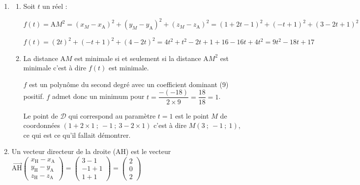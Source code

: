 \documentclass[10pt]{article}
\providecommand{\vect}[1]{\overrightarrow{#1}}
\begin{document}
\begin{enumerate}
\begin{enumerate}
$\left\{\begin{array}{@{}l} x_{\mathrm{A}}=1+2t\\y_{\mathrm{A}}=-t\\z_{\mathrm{A}}=3-2t\end{array}\right. 	
\iff \left\{\begin{array}{@{}l} 1=1+2t\\-1=-t\\-1=3-2t\end{array}\right. 	  
\iff \left\{\begin{array}{@{}l} 0=2t\\1=t\\2t=4\end{array}\right. 	  
\iff \left\{\begin{array}{@{}l} t=0\\t=1\\t=2\end{array}\right. $

Ce système n'admet pas de solution donc le point A n'appartient donc pas à la droite $\mathcal{D}$.
\end{enumerate}

\item
	\begin{enumerate}
		\item  Soit $t$ un réel :

$f(t)=\mathrm{A}M^2= {(x_M - x_\mathrm{A})^2+(y_M - y_\mathrm{A})^2+(z_M - z_\mathrm{A})^2} ={ (1+2t-1)^2+ (-t+1)^2+(3-2t+1)^2    }$

$f(t) ={ (2t)^2+ (-t+1)^2+(4-2t)^2  } 
={ 4t^2+ t^2-2t+1+16-16t+4t^2    }= 9t^2-18t+17$ 

	\item La distance A$M$ est minimale si et seulement si la distance A$M^2$ est minimale c'est à dire $f(t)$ est minimale.

	$f$ est un polynôme du second degré avec un coefficient dominant (9)  positif.  $f$ admet donc un minimum pour $t=\dfrac{-(-18)}{2\times 9} = \dfrac{18}{18}=1$.
	
	Le point de $\mathcal{D}$ qui correspond au paramètre $t=1$ est le point $M$ de coordonnées $(1+2\times 1~;~-1~;~3-2\times 1)$ c'est à dire $M(3~;~-1~;~1)$, ce qui est ce qu'il fallait démontrer.

	\end{enumerate}

\item Un vecteur directeur de la droite (AH) est le vecteur $\vect{\mathrm{AH}} \begin{pmatrix} x_\mathrm{H}-x_\mathrm{A}\\y_\mathrm{H}-y_\mathrm{A}\\z_\mathrm{H}-z_\mathrm{A} \end{pmatrix} = \begin{pmatrix} 3-1\\-1+1\\1+1\end{pmatrix}= \begin{pmatrix} 2\\0\\2\end{pmatrix}$


\end{enumerate}
\end{document}
